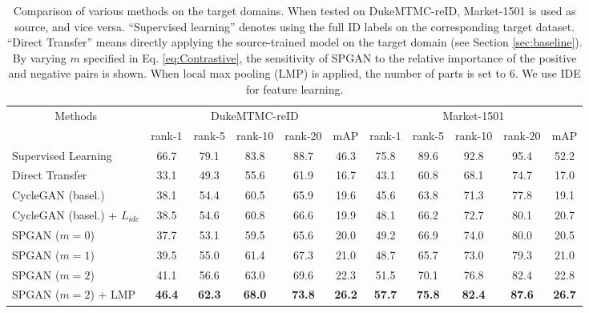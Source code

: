\documentclass[10pt,twocolumn,letterpaper]{article}
\begin{document}
\setlength{\tabcolsep}{5pt}
\begin{table*}[t]
\begin{center}
\begin{tabular}{l|ccccc|ccccc}
\hline
\multicolumn{1}{c|}{\multirow{2}{*}{Methods}}&\multicolumn{5}{c|}{DukeMTMC-reID}&\multicolumn{5}{c}{Market-1501}\\
\cline{2-11}
\multicolumn{1}{c|}{}&rank-1&rank-5&rank-10&rank-20&mAP&rank-1&rank-5&rank-10&rank-20&mAP\\
\hline
\hline
Supervised Learning &66.7&79.1 &83.8 & 88.7&46.3&75.8&89.6&92.8&95.4&52.2\\
\hline
Direct Transfer &33.1&49.3&55.6 &61.9&16.7 &43.1&60.8&68.1&74.7&17.0\\
CycleGAN (basel.) &38.1&54.4&60.5&65.9&19.6&45.6 & 63.8&71.3 &77.8&19.1 \\
CycleGAN (basel.) + $L_{ide}$ &38.5&54.6&60.8&66.6&19.9&48.1&66.2&72.7&80.1&20.7\\
\hline
SPGAN ($m=0$) &37.7&53.1&59.5&65.6&20.0&49.2&66.9&74.0&80.0&20.5\\
SPGAN ($m=1$) &39.5&55.0&61.4&67.3&21.0&48.7&65.7&73.0&79.3&21.0\\
SPGAN ($m=2$) &41.1&56.6 &63.0&69.6&22.3&51.5&70.1&76.8&82.4&22.8\\
{SPGAN ($m=2$) + LMP}&\textbf{46.4}&\textbf{62.3}&\textbf{68.0}&\textbf{73.8}&\textbf{26.2}&\textbf{57.7}&\textbf{75.8}&\textbf{82.4}&\textbf{87.6}&\textbf{26.7} \\
\hline
\end{tabular}
\end{center}
\setlength{\abovecaptionskip}{-0cm} 
\caption{Comparison of various methods on the target domains. When tested on DukeMTMC-reID, Market-1501 is used as source, and vice versa. ``Supervised learning'' denotes using the full ID labels on the corresponding target dataset. ``Direct Transfer'' means directly applying the source-trained model on the target domain (see Section \ref{sec:baseline}). By varying $m$ specified in Eq. \ref{eq:Contrastive}, the sensitivity of SPGAN to the relative importance of the positive and negative pairs is shown. When local max pooling (LMP) is applied, the number of parts is set to 6. We use IDE \cite{DBLP:journals/corr/ZhengYH16}  for feature learning.} \label{Compare base}
\label{table:cmpbasl}
\end{table*}
\end{document}
